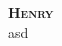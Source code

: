 \documentclass[letterpaper,11pt]{article}
\begin{document}
\begin{center}
    \textbf{\Huge \scshape Henry} \\ \vspace{1pt}
    \small
            asd
         \textbar\ 
\end{center}


\end{document}
